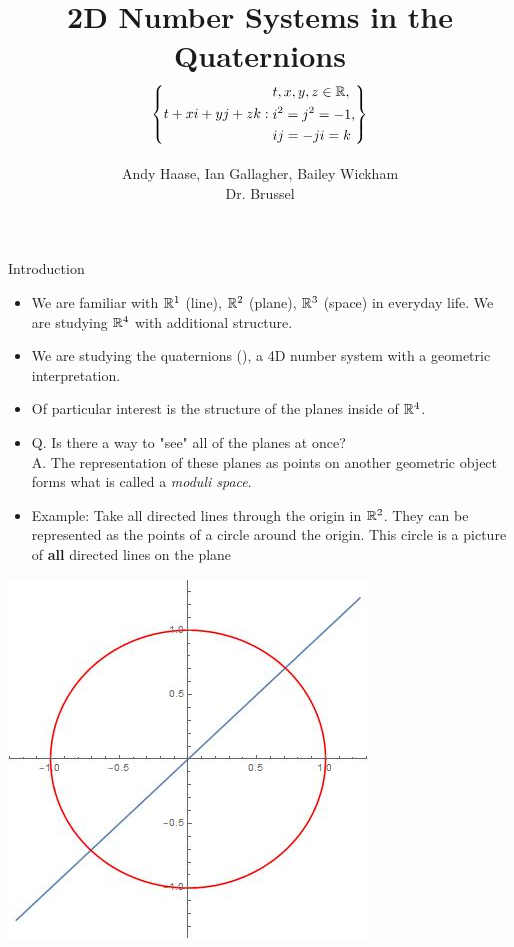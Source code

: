 \documentclass[t,slidestop,compress,mathserif,color=option,hyperref={pdfstartview={Fit},pdfpagelayout={SinglePage},pdfpagemode={UseOutlines}}]{beamer}
\begin{document}
\allowdisplaybreaks

\title[Quaternions]
    {2D Number Systems in the Quaternions 
        \begin{align*}
            \left\{t+xi+yj+zk: 
            \begin{aligned}
                & t, x, y, z \in \protect\mathbb{R}, \\
                & i^2 = j^2 = -1, \\
                & ij = -ji = k 
            \end{aligned}
            \right\}
        \end{align*}     
    }
\author[Andy, Ian, Bailey]
    {Andy Haase, Ian Gallagher, Bailey Wickham \\ Dr. Brussel}

\begin{frame}
  \titlepage
\end{frame}

\begin{frame}{Introduction}
    \begin{itemize}
        \item We are familiar with $\protect\mathbb{R}^1$ (line), $\protect\mathbb{R}^2$ (plane), $\protect\mathbb{R}^3$ (space) in everyday life. We are studying $\protect\mathbb{R}^4$ with additional structure.  
        \item We are studying the quaternions (\bH), a 4D number system with a geometric interpretation.
        \item Of particular interest is the structure of the planes inside of $\protect\mathbb{R}^4$.
        \item Q. Is there a way to "see" all of the planes at once? \\
              A. The representation of these planes as points on another geometric object forms what is called a \textit{moduli space}.  
       \item Example: Take all directed lines through the origin in $\protect\mathbb{R}^2$. They can be represented as the points of a circle around the origin. This circle is a picture of \textbf{all} directed lines on the plane
    \end{itemize}
    \centering
    \includegraphics[scale=.15]{H Pres - 8-20-20/CircleModuliSpace.jpg}
    \end{frame}
\end{document}
